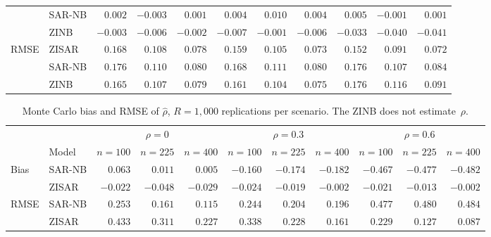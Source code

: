 \begin{table}[htbp]
\begin{tabular}{ll rrr rrr rrr}
  & SAR-NB   & $0.002$ & $-0.003$ & $0.001$ & $0.004$ & $0.010$ & $0.004$ & $0.005$ & $-0.001$ & $0.001$ \\
  & ZINB     & $-0.003$ & $-0.006$ & $-0.002$ & $-0.007$ & $-0.001$ & $-0.006$ & $-0.033$ & $-0.040$ & $-0.041$ \\
[3pt]
\multirow{3}{*}{RMSE}
  & ZISAR    & $0.168$ & $0.108$ & $0.078$ & $0.159$ & $0.105$ & $0.073$ & $0.152$ & $0.091$ & $0.072$ \\
  & SAR-NB   & $0.176$ & $0.110$ & $0.080$ & $0.168$ & $0.111$ & $0.080$ & $0.176$ & $0.107$ & $0.084$ \\
  & ZINB     & $0.165$ & $0.107$ & $0.079$ & $0.161$ & $0.104$ & $0.075$ & $0.176$ & $0.116$ & $0.091$ \\
\bottomrule
\end{tabular}
\end{table}

\begin{table}[htbp]
\centering
\caption{Monte Carlo bias and RMSE of $\hat{\rho}$, $R=1{,}000$ replications per scenario. The ZINB does not estimate~$\rho$.}\label{tab:mc_rho}
\footnotesize
\setlength{\tabcolsep}{4pt}
\begin{tabular}{ll rrr rrr rrr}
\toprule
& & \multicolumn{3}{c}{$\rho=0$} & \multicolumn{3}{c}{$\rho=0.3$} & \multicolumn{3}{c}{$\rho=0.6$} \\
\cmidrule(lr){3-5}\cmidrule(lr){6-8}\cmidrule(lr){9-11}
& Model & $n{=}100$ & $n{=}225$ & $n{=}400$ & $n{=}100$ & $n{=}225$ & $n{=}400$ & $n{=}100$ & $n{=}225$ & $n{=}400$ \\
\midrule
\multirow{2}{*}{Bias}
  & SAR-NB   & $0.063$ & $0.011$ & $0.005$ & $-0.160$ & $-0.174$ & $-0.182$ & $-0.467$ & $-0.477$ & $-0.482$ \\
  & ZISAR    & $-0.022$ & $-0.048$ & $-0.029$ & $-0.024$ & $-0.019$ & $-0.002$ & $-0.021$ & $-0.013$ & $-0.002$ \\
[3pt]
\multirow{2}{*}{RMSE}
  & SAR-NB   & $0.253$ & $0.161$ & $0.115$ & $0.244$ & $0.204$ & $0.196$ & $0.477$ & $0.480$ & $0.484$ \\
  & ZISAR    & $0.433$ & $0.311$ & $0.227$ & $0.338$ & $0.228$ & $0.161$ & $0.229$ & $0.127$ & $0.087$ \\
\bottomrule
\end{tabular}
\end{table}

